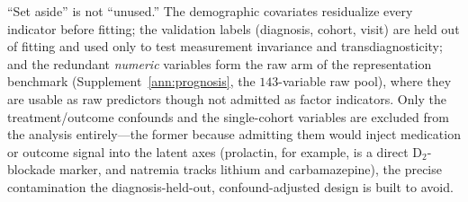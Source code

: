 ``Set aside'' is not ``unused.'' The demographic covariates residualize every indicator before
fitting; the validation labels (diagnosis, cohort, visit) are held out of fitting and used only
to test measurement invariance and transdiagnosticity; and the redundant \emph{numeric}
variables form the raw arm of the representation benchmark (Supplement~\ref{ann:prognosis}, the
$143$-variable raw pool), where they are usable as raw predictors though not admitted as factor
indicators. Only the treatment/outcome confounds and the single-cohort variables are excluded
from the analysis entirely---the former because admitting them would inject medication or
outcome signal into the latent axes (prolactin, for example, is a direct $\mathrm{D_2}$-blockade
marker, and natremia tracks lithium and carbamazepine), the precise contamination the
diagnosis-held-out, confound-adjusted design is built to avoid.

